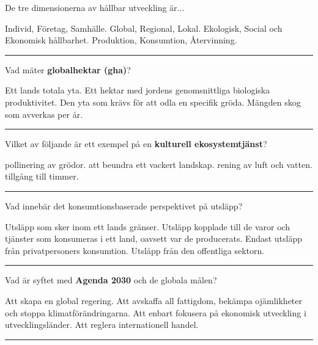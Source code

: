 \documentclass{exam}
\begin{document}
\begin{questions}
\question De tre dimensionerna av hållbar utveckling är...
\vspace{2mm}
\begin{checkboxes}
    \choice Individ, Företag, Samhälle.
    \choice Global, Regional, Lokal.
    \choice Ekologisk, Social och Ekonomisk hållbarhet.
    \choice Produktion, Konsumtion, Återvinning.
\end{checkboxes}
\vspace{5mm} \hrule \vspace{5mm}
\break
\question Vad mäter \textbf{globalhektar (gha)}?
\vspace{2mm}
\begin{checkboxes}
    \choice Ett lands totala yta.
    \choice Ett hektar med jordens genomsnittliga biologiska produktivitet.
    \choice Den yta som krävs för att odla en specifik gröda.
    \choice Mängden skog som avverkas per år.
\end{checkboxes}
\vspace{5mm} \hrule \vspace{5mm}

\question Vilket av följande är ett exempel på en \textbf{kulturell ekosystemtjänst}?
\vspace{2mm}
\begin{checkboxes}
    \choice pollinering av grödor.
    \choice att beundra ett vackert landskap.
    \choice rening av luft och vatten.
    \choice tillgång till timmer.
\end{checkboxes}
\vspace{5mm} \hrule \vspace{5mm}

\question Vad innebär det konsumtionsbaserade perspektivet på utsläpp?
\vspace{2mm}
\begin{checkboxes}
    \choice Utsläpp som sker inom ett lands gränser.
    \choice Utsläpp kopplade till de varor och tjänster som konsumeras i ett land, oavsett var de producerats.
    \choice Endast utsläpp från privatpersoners konsumtion.
    \choice Utsläpp från den offentliga sektorn.
\end{checkboxes}
\vspace{5mm} \hrule \vspace{5mm}

\question Vad är syftet med \textbf{Agenda 2030} och de globala målen?
\vspace{2mm}
\begin{checkboxes}
    \choice Att skapa en global regering.
    \choice Att avskaffa all fattigdom, bekämpa ojämlikheter och stoppa klimatförändringarna.
    \choice Att enbart fokusera på ekonomisk utveckling i utvecklingsländer.
    \choice Att reglera internationell handel.
\end{checkboxes}
\vspace{5mm} \hrule \vspace{5mm}


\end{questions}
\end{document}
